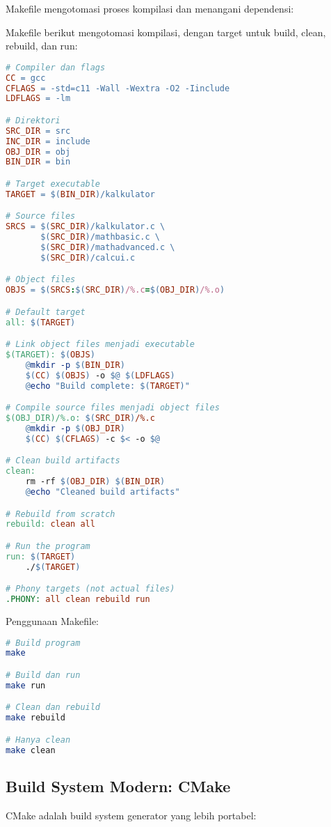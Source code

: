 \documentclass[../main.tex]{subfiles}
\begin{document}
Makefile mengotomasi proses kompilasi dan menangani dependensi:

Makefile berikut mengotomasi kompilasi, dengan target untuk build, clean, rebuild, dan run:

\begin{lstlisting}[language=make, caption={Makefile lengkap untuk kalkulator}]
# Compiler dan flags
CC = gcc
CFLAGS = -std=c11 -Wall -Wextra -O2 -Iinclude
LDFLAGS = -lm

# Direktori
SRC_DIR = src
INC_DIR = include
OBJ_DIR = obj
BIN_DIR = bin

# Target executable
TARGET = $(BIN_DIR)/kalkulator

# Source files
SRCS = $(SRC_DIR)/kalkulator.c \
       $(SRC_DIR)/mathbasic.c \
       $(SRC_DIR)/mathadvanced.c \
       $(SRC_DIR)/calcui.c

# Object files
OBJS = $(SRCS:$(SRC_DIR)/%.c=$(OBJ_DIR)/%.o)

# Default target
all: $(TARGET)

# Link object files menjadi executable
$(TARGET): $(OBJS)
	@mkdir -p $(BIN_DIR)
	$(CC) $(OBJS) -o $@ $(LDFLAGS)
	@echo "Build complete: $(TARGET)"

# Compile source files menjadi object files
$(OBJ_DIR)/%.o: $(SRC_DIR)/%.c
	@mkdir -p $(OBJ_DIR)
	$(CC) $(CFLAGS) -c $< -o $@

# Clean build artifacts
clean:
	rm -rf $(OBJ_DIR) $(BIN_DIR)
	@echo "Cleaned build artifacts"

# Rebuild from scratch
rebuild: clean all

# Run the program
run: $(TARGET)
	./$(TARGET)

# Phony targets (not actual files)
.PHONY: all clean rebuild run
\end{lstlisting}

Penggunaan Makefile:
\begin{lstlisting}[language=bash, caption={Menggunakan Makefile}]
# Build program
make

# Build dan run
make run

# Clean dan rebuild
make rebuild

# Hanya clean
make clean
\end{lstlisting}

\subsection{Build System Modern: CMake}

CMake adalah build system generator yang lebih portabel:
\end{document}
